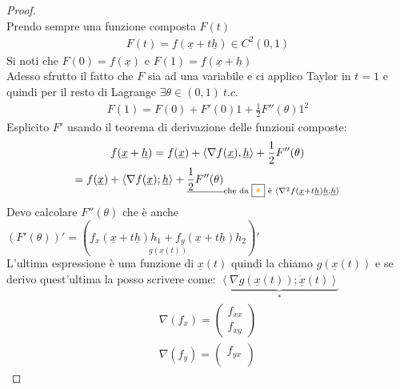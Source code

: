 \documentclass[a4paper, oneside]{article}
\begin{document}
        \begin{proof}
            \hfil\\
            Prendo sempre una funzione composta $F(t)$
            \begin{gather*}
                F(t) = f(\underline{x} + t \underline{h}) \in C^2(0,1)
            \end{gather*}
            Si noti che $F(0) = f(\underline{x})$ e $F(1) = f(\underline{x} + \underline{h})$\\
            Adesso sfrutto il fatto che $F$ sia ad una variabile e ci applico Taylor in $t=1$ e quindi per il resto di Lagrange $\exists \theta \in (0,1) \ t.c.$\\
            \begin{gather*}
                F(1) = F(0) + F'(0) 1 + \frac{1}{2} F''(\theta)1^2
            \end{gather*}
            Esplicito $F'$ usando il teorema di derivazione delle funzioni composte:
            \begin{gather*}
                f(\underline{x} + \underline{h}) = f(\underline{x}) + \left\langle \nabla f(\underline{x}),\underline{h} \right\rangle + \frac{1}{2}F''(\theta)\\
                = f(\underline{x}) + \left\langle \nabla f(\underline{x});\underline{h} \right\rangle +\underline{\frac{1}{2} F''(\theta)}_{\text{che da } \boxed{\textcolor{orange}{*}} \text{ è } \left\langle \nabla^2f(\underline{x} + t \underline{h})\underline{h} ; \underline{h}\right\rangle}
                \end{gather*}
            Devo calcolare $F''(\theta)$ che è anche $(F'(\theta))' = (\underset{g(\underline{x}(t))}{f_x(\underline{x}+ t \underline{h})h_1+f_y(\underline{x} + t\underline{h})h_2})'$\\
            L'ultima espressione è una funzione di $\underline{x}(t)$ quindi la chiamo $g(\underline{x}(t))$ e se derivo quest'ultima la posso scrivere come: $\underbrace{\left\langle \nabla g(\underline{x}(t)); \dot{\underline{x}}(t) \right\rangle}_{\boxed{*}}$
            \begin{gather*}
                \nabla (f_x) = \begin{pmatrix}
                    f_{xx}\\
                    f_{xy}
                \end{pmatrix}\\
                \nabla (f_y) = \begin{pmatrix}
                    f_{yx}\\

\end{pmatrix}
\end{gather*}
\end{proof}
\end{document}
